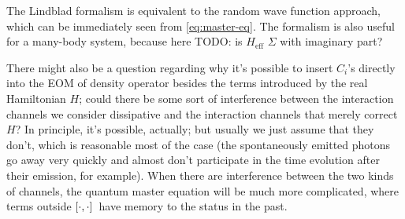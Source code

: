 \documentclass[hyperref, a4paper]{article}
\begin{document}
The Lindblad formalism is equivalent to the random wave function approach,
which can be immediately seen from \eqref{eq:master-eq}.
The formalism is also useful for a many-body system, 
because here TODO: is $H_{\text{eff}}$ $\Sigma$ with imaginary part?

There might also be a question regarding why it's possible 
to insert $C_i$'s directly into the EOM of density operator 
besides the terms introduced by the real Hamiltonian $H$; 
could there be some sort of interference between 
the interaction channels we consider dissipative and 
the interaction channels that merely correct $H$?
In principle, it's possible, actually; 
but usually we just assume that they don't, 
which is reasonable most of the case 
(the spontaneously emitted photons go away very quickly 
and almost don't participate in the time evolution after their emission, for example).
When there are interference between the two kinds of channels, 
the quantum master equation will be much more complicated, 
where terms outside $\comm*{\cdot}{\cdot}$
have memory to the status in the past.
\end{document}
